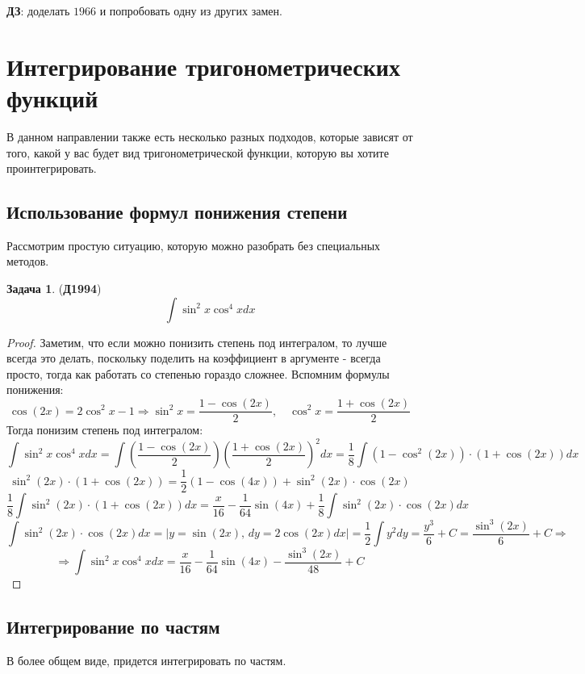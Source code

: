 \documentclass[12pt]{article}
\theoremstyle{definition}
\newtheorem{problem}{Задача}
\DeclareMathOperator{\dint}{\displaystyle\int}
\begin{document}
\textbf{ДЗ}: доделать $1966$ и попробовать одну из других замен.
\newpage

\section*{Интегрирование тригонометрических функций}
В данном направлении также есть несколько разных подходов, которые зависят от того, какой у вас будет вид тригонометрической функции, которую вы хотите проинтегрировать. 

\subsection*{Использование формул понижения степени}
Рассмотрим простую ситуацию, которую можно разобрать без специальных методов.

\begin{problem}(\textbf{Д1994})
	$$
		\dint \sin^2{x} \cos^4{x}dx
	$$
\end{problem}
\begin{proof}
	Заметим, что если можно понизить степень под интегралом, то лучше всегда это делать, поскольку поделить на коэффициент в аргументе - всегда просто, тогда как работать со степенью гораздо сложнее. Вспомним формулы понижения:
	$$
		\cos{(2x)} = 2\cos^2{x} -1 \Rightarrow \sin^2{x} =  \dfrac{1 - \cos{(2x)}}{2}, \quad \cos^2{x} = \dfrac{1 + \cos{(2x)}}{2}
	$$
	Тогда понизим степень под интегралом:
	$$
		\dint \sin^2{x} \cos^4{x}dx = \dint \left(\dfrac{1 - \cos{(2x)}}{2}\right) \left(\dfrac{1 + \cos{(2x)}}{2}\right)^2 dx = \dfrac{1}{8}\dint (1 - \cos^2{(2x)}){\cdot}(1 + \cos{(2x)})dx
	$$
	$$
		\sin^2{(2x)}{\cdot}(1 + \cos{(2x)}) = \dfrac{1}{2}(1 - \cos{(4x)}) + \sin^2{(2x)}{\cdot}\cos{(2x)}
	$$
	$$
		\dfrac{1}{8}\dint \sin^2{(2x)}{\cdot}(1 + \cos{(2x)})dx = \dfrac{x}{16} - \dfrac{1}{64}\sin{(4x)} + \dfrac{1}{8}\dint \sin^2{(2x)}{\cdot}\cos{(2x)} dx
	$$
	$$
		\dint \sin^2{(2x)}{\cdot}\cos{(2x)} dx =|y = \sin{(2x)}, \, dy = 2\cos{(2x)}dx| = \dfrac{1}{2}\dint y^2 dy = \dfrac{y^3}{6} + C = \dfrac{\sin^3{(2x)}}{6} + C \Rightarrow
	$$
	$$
		\Rightarrow \dint \sin^2{x} \cos^4{x}dx = \dfrac{x}{16} - \dfrac{1}{64}\sin{(4x)} - \dfrac{\sin^3{(2x)}}{48} + C
	$$
\end{proof}

\subsection*{Интегрирование по частям}
В более общем виде, придется интегрировать по частям.
\end{document}
